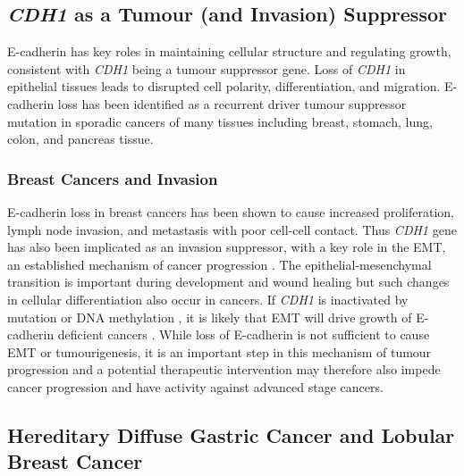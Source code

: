 \subsection{\textit{CDH1} as a Tumour (and Invasion) Suppressor}
\gls{E-cadherin} has key roles in maintaining cellular structure and regulating growth, consistent with \textit{CDH1} being a tumour suppressor gene. Loss of \textit{CDH1} in epithelial tissues leads to disrupted cell polarity, differentiation, and  migration. \gls{E-cadherin} loss has been identified as a recurrent driver tumour suppressor mutation in sporadic cancers of many tissues including breast, stomach, lung, colon, and pancreas tissue.

\subsubsection{Breast Cancers and Invasion}
\gls{E-cadherin} loss in breast cancers has been shown to cause increased proliferation, lymph node invasion, and metastasis with poor cell-cell contact. Thus \textit{CDH1} gene has also been implicated as an invasion suppressor, with a key role in the \gls{EMT}, an established mechanism of cancer progression \citep{Hanahan2011}. The epithelial-mesenchymal transition is important during development and wound healing but such changes in cellular differentiation also occur in cancers. If \textit{CDH1} is inactivated by mutation or DNA methylation \citep{Berx1996,Guilford1999,Machado2001}, it is likely that \gls{EMT} will drive growth of \gls{E-cadherin} deficient cancers \citep{Berx2009,Graziano2003,Polyak2009}. While loss of \gls{E-cadherin} is not sufficient to cause \gls{EMT} or tumourigenesis, it is an important step in this mechanism of tumour progression and a potential therapeutic intervention may therefore also impede cancer progression and have activity against advanced stage cancers.

\subsection{Hereditary Diffuse Gastric Cancer and Lobular Breast Cancer}


